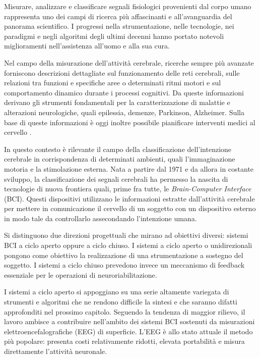 Misurare, analizzare e classificare segnali fisiologici provenienti dal corpo umano rappresenta uno dei campi di ricerca più affascinanti e all'avanguardia del panorama scientifico. I progressi nella strumentazione, nelle tecnologie, nei paradigmi e negli algoritmi degli ultimi decenni hanno portato notevoli miglioramenti nell'assistenza all'uomo e alla sua cura. 

Nel campo della misurazione dell'attività cerebrale, ricerche sempre più avanzate forniscono descrizioni dettagliate sul funzionamento delle reti cerebrali, sulle relazioni tra funzioni e specifiche aree o determinati ritmi motori e sul comportamento dinamico durante i processi cognitivi. Da queste informazioni derivano gli strumenti fondamentali per la caratterizzazione di malattie e alterazioni neurologiche, quali epilessia, demenze, Parkinson, Alzheimer. Sulla base di queste informazioni è oggi inoltre possibile pianificare interventi medici al cervello \cite{zhang2024braincomputer}. 

In questo contesto è rilevante il campo della classificazione dell'intenzione cerebrale in corrispondenza di determinati ambienti, quali l'immaginazione motoria e la stimolazione esterna. Nata a partire dal 1971 \cite{Nirenberg1971-rp} e da allora in costante sviluppo, la classificazione dei segnali cerebrali ha permesso la nascita di tecnologie di nuova frontiera quali, prime fra tutte, le \emph{Brain-Computer Interface} (BCI). Questi dispositivi utilizzano le informazioni estratte dall'attività cerebrale per mettere in comunicazione il cervello di un soggetto con un dispositivo esterno in modo tale da controllarlo assecondando l'intenzione umana.

Si distinguono due direzioni progettuali che mirano ad obiettivi diversi: sistemi BCI a ciclo aperto oppure a ciclo chiuso. I sistemi a ciclo aperto o unidirezionali pongono come obiettivo la realizzazione di una strumentazione a sostegno del soggetto. I sistemi a ciclo chiuso prevedono invece un meccanismo di feedback essenziale per le operazioni di neuroriabilitazione. 

I sistemi a ciclo aperto si appoggiano su una serie altamente variegata di strumenti e algoritmi che ne rendono difficile la sintesi e che saranno difatti approfonditi nel prossimo capitolo. Seguendo la tendenza di maggior rilievo, il lavoro ambisce a contribuire nell'ambito dei sistemi BCI sostenuti da misurazioni elettroencefalografiche (EEG) di superficie. L'EEG è allo stato attuale il metodo più popolare: presenta costi relativamente ridotti, elevata portabilità e misura direttamente l'attività neuronale. 

